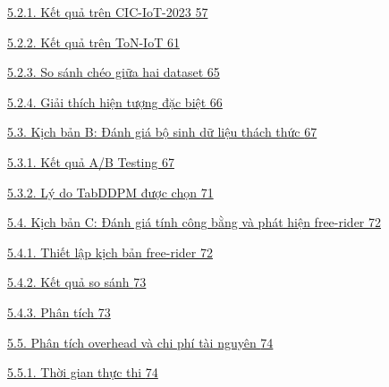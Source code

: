 \hyperref[kux1ebft-quux1ea3-truxean-cic-iot-2023]{5.2.1. Kết quả trên CIC-IoT-2023 \hyperref[kux1ebft-quux1ea3-truxean-cic-iot-2023]{57}}

\hyperref[kux1ebft-quux1ea3-truxean-ton-iot]{5.2.2. Kết quả trên ToN-IoT \hyperref[kux1ebft-quux1ea3-truxean-ton-iot]{61}}

\hyperref[so-suxe1nh-chuxe9o-giux1eefa-hai-dataset]{5.2.3. So sánh chéo giữa hai dataset \hyperref[so-suxe1nh-chuxe9o-giux1eefa-hai-dataset]{65}}

\hyperref[giux1ea3i-thuxedch-hiux1ec7n-tux1b0ux1ee3ng-ux111ux1eb7c-biux1ec7t]{5.2.4. Giải thích hiện tượng đặc biệt \hyperref[giux1ea3i-thuxedch-hiux1ec7n-tux1b0ux1ee3ng-ux111ux1eb7c-biux1ec7t]{66}}

\hyperref[kux1ecbch-bux1ea3n-b-ux111uxe1nh-giuxe1-bux1ed9-sinh-dux1eef-liux1ec7u-thuxe1ch-thux1ee9c]{5.3. Kịch bản B: Đánh giá bộ sinh dữ liệu thách thức \hyperref[kux1ecbch-bux1ea3n-b-ux111uxe1nh-giuxe1-bux1ed9-sinh-dux1eef-liux1ec7u-thuxe1ch-thux1ee9c]{67}}

\hyperref[kux1ebft-quux1ea3-ab-testing]{5.3.1. Kết quả A/B Testing \hyperref[kux1ebft-quux1ea3-ab-testing]{67}}

\hyperref[luxfd-do-tabddpm-ux111ux1b0ux1ee3c-chux1ecdn]{5.3.2. Lý do TabDDPM được chọn \hyperref[luxfd-do-tabddpm-ux111ux1b0ux1ee3c-chux1ecdn]{71}}

\hyperref[kux1ecbch-bux1ea3n-c-ux111uxe1nh-giuxe1-tuxednh-cuxf4ng-bux1eb1ng-vuxe0-phuxe1t-hiux1ec7n-free-rider]{5.4. Kịch bản C: Đánh giá tính công bằng và phát hiện free-rider \hyperref[kux1ecbch-bux1ea3n-c-ux111uxe1nh-giuxe1-tuxednh-cuxf4ng-bux1eb1ng-vuxe0-phuxe1t-hiux1ec7n-free-rider]{72}}

\hyperref[thiux1ebft-lux1eadp-kux1ecbch-bux1ea3n-free-rider]{5.4.1. Thiết lập kịch bản free-rider \hyperref[thiux1ebft-lux1eadp-kux1ecbch-bux1ea3n-free-rider]{72}}

\hyperref[kux1ebft-quux1ea3-so-suxe1nh]{5.4.2. Kết quả so sánh \hyperref[kux1ebft-quux1ea3-so-suxe1nh]{73}}

\hyperref[phuxe2n-tuxedch]{5.4.3. Phân tích \hyperref[phuxe2n-tuxedch]{73}}

\hyperref[phuxe2n-tuxedch-overhead-vuxe0-chi-phuxed-tuxe0i-nguyuxean]{5.5. Phân tích overhead và chi phí tài nguyên \hyperref[phuxe2n-tuxedch-overhead-vuxe0-chi-phuxed-tuxe0i-nguyuxean]{74}}

\hyperref[thux1eddi-gian-thux1ef1c-thi]{5.5.1. Thời gian thực thi \hyperref[thux1eddi-gian-thux1ef1c-thi]{74}}

